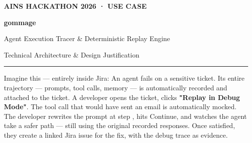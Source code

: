 \documentclass[11pt, a4paper]{article}
\begin{document}
\pagecolor{pureblack} %
\color{purewhite}     %

\begin{titlepage}
  \centering
  \vspace*{2cm}

  {\titlefont\small\textcolor{goldlight}{\textbf{AINS HACKATHON 2026 · USE CASE }}}

  \vspace{1.2cm}

  {\titlefont\Huge\bfseries\color{purewhite} gommage}

  \vspace{0.6cm}

  {\titlefont\Large\color{rosered} Agent Execution Tracer \& Deterministic Replay Engine}

  \vspace{0.6cm}

  {\titlefont\large\color{goldlight} Technical Architecture \& Design Justification}

  \vspace{1.5cm}
  {\color{goldlight}\rule{0.6\textwidth}{1.5pt}}
  \vspace{1.5cm}

  \begin{tcolorbox}[pitchbox=The Vision]
    Imagine this — entirely inside Jira: An agent fails on a sensitive ticket. Its entire trajectory — prompts, tool calls, memory — is automatically recorded and attached to the ticket. A developer opens the ticket, clicks \textbf{"Replay in Debug Mode"}. The tool call that would have sent an email is automatically mocked. The developer rewrites the prompt at step \dialogfont, hits Continue, and watches the agent take a safer path — still using the original recorded responses. Once satisfied, they create a linked Jira issue for the fix, with the debug trace as evidence.
  \end{tcolorbox}

  \vspace{2.5cm}


\end{titlepage}
\end{document}
